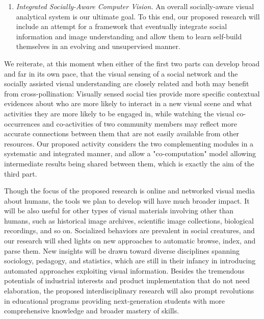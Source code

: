 \begin{enumerate}
\item \vspace{-0.05in}\emph{Integrated Socially-Aware Computer Vision.} An overall socially-aware visual analytical system is our ultimate goal. To this end, our proposed research will include an attempt for a framework that eventually integrate social information and image understanding and allow them to learn self-build themselves in an evolving and unsupervised manner.
\end{enumerate}
We reiterate, at this moment when either of the first two parts can develop broad and far in its own pace, that the visual sensing of a social network and the socially assisted visual understanding are closely related and both may benefit from cross-pollination: Visually sensed social ties provide more specific contextual evidences about who are more likely to interact in a new visual scene and what activities they are more likely to be engaged in, while watching the visual co-occurrences and co-activities of two community members may reflect more accurate connections between them that are not easily available from other resources. Our proposed activity considers the two complementing modules in a systematic and integrated manner, and allow a "co-computation" model allowing intermediate results being shared between them, which is exactly the aim of the third part.

Though the focus of the proposed research is online and networked visual media about humans, the tools we plan to develop will have much broader impact.  It will be also useful for other types of visual materials involving other than humans, such as historical image archives, scientific image collections, biological recordings, and so on. Socialized behaviors are prevalent in social creatures, and our research will shed lights on new approaches to automatic browse, index, and parse them. New insights will be drawn toward diverse disciplines spanning sociology, pedagogy, and statistics, which are still in their infancy in introducing automated approaches exploiting visual information. Besides the tremendous potentials of industrial interests and product implementation that do not need elaboration, the proposed interdisciplinary research will also prompt revolutions in educational programs providing next-generation students with more comprehensive knowledge and broader mastery of skills.